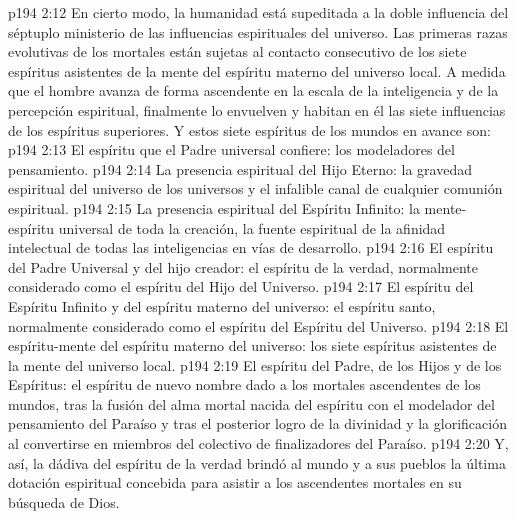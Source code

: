 \vs p194 2:12 En cierto modo, la humanidad está supeditada a la doble influencia del séptuplo ministerio de las influencias espirituales del universo. Las primeras razas evolutivas de los mortales están sujetas al contacto consecutivo de los siete espíritus asistentes de la mente del espíritu materno del universo local. A medida que el hombre avanza de forma ascendente en la escala de la inteligencia y de la percepción espiritual, finalmente lo envuelven y habitan en él las siete influencias de los espíritus superiores. Y estos siete espíritus de los mundos en avance son:
\vs p194 2:13 El espíritu que el Padre universal confiere: los modeladores del pensamiento.
\vs p194 2:14 La presencia espiritual del Hijo Eterno: la gravedad espiritual del universo de los universos y el infalible canal de cualquier comunión espiritual.
\vs p194 2:15 La presencia espiritual del Espíritu Infinito: la mente\hyp{}espíritu universal de toda la creación, la fuente espiritual de la afinidad intelectual de todas las inteligencias en vías de desarrollo.
\vs p194 2:16 El espíritu del Padre Universal y del hijo creador: el espíritu de la verdad, normalmente considerado como el espíritu del Hijo del Universo.
\vs p194 2:17 El espíritu del Espíritu Infinito y del espíritu materno del universo: el espíritu santo, normalmente considerado como el espíritu del Espíritu del Universo.
\vs p194 2:18 El espíritu\hyp{}mente del espíritu materno del universo: los siete espíritus asistentes de la mente del universo local.
\vs p194 2:19 El espíritu del Padre, de los Hijos y de los Espíritus: el espíritu de nuevo nombre dado a los mortales ascendentes de los mundos, tras la fusión del alma mortal nacida del espíritu con el modelador del pensamiento del Paraíso y tras el posterior logro de la divinidad y la glorificación al convertirse en miembros del colectivo de finalizadores del Paraíso.
\vs p194 2:20 \pc Y, así, la dádiva del espíritu de la verdad brindó al mundo y a sus pueblos la última dotación espiritual concebida para asistir a los ascendentes mortales en su búsqueda de Dios.
